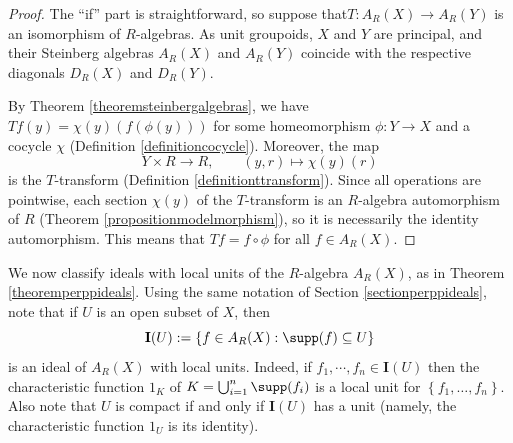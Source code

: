 \begin{proof}
The ``if'' part is straightforward, so suppose that$T:A_R(X)\to A_R(Y)$ is an isomorphism of $R$-algebras. As unit groupoids, $X$ and $Y$ are principal, and their Steinberg algebras $A_R(X)$ and $A_R(Y)$ coincide with the respective diagonals $D_R(X)$ and $D_R(Y)$.

By Theorem \ref{theoremsteinbergalgebras}, we have $Tf(y)=\chi(y)(f(\phi(y)))$ for some homeomorphism $\phi:Y\to X$ and a cocycle $\chi$ (Definition \ref{definitioncocycle}). Moreover, the map
\[Y\times R\to R,\qquad (y,r)\mapsto\chi(y)(r)\]
is the $T$-transform (Definition \ref{definitionttransform}). Since all operations are pointwise, each section $\chi(y)$ of the $T$-transform is an $R$-algebra automorphism of $R$ (Theorem \ref{propositionmodelmorphism}), so it is necessarily the identity automorphism. This means that $Tf=f\circ\phi$ for all $f\in A_R(X)$.\qedhere
\end{proof}

We now classify ideals with local units of the $R$-algebra $A_R(X)$, as in Theorem \ref{theoremperppideals}. Using the same notation of Section \ref{sectionperppideals}, note that if $U$ is an open subset of $X$, then 
\[\mathbf{I}(U):=\left\{f\in A_R(X):\supp(f)\subseteq U\right\}\]%
is an ideal of $A_R(X)$ with local units. Indeed, if $f_1, \cdots, f_n \in \mathbf{I}(U)$ then  the characteristic function $1_K$ of $K=\bigcup_{i=1}^n \supp(f_i)$ is a local unit for $\left\{f_1,\ldots,f_n\right\}$. Also note that $U$ is compact if and only if $\mathbf{I}(U)$ has a unit (namely, the characteristic function $1_U$ is its identity).

